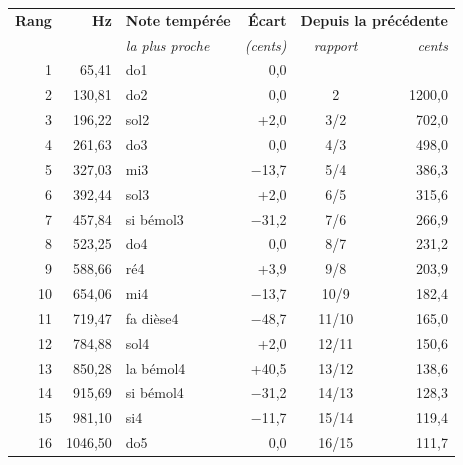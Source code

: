 
\begin{tabular}{@{}r r l r c r@{}}
\toprule
\textbf{Rang} & \textbf{Hz} & \textbf{Note tempérée} & \textbf{Écart} & \multicolumn{2}{c}{\textbf{Depuis la précédente}} \\
 & & \textit{la plus proche} & \textit{(cents)} & \textit{rapport} & \textit{cents} \\
\midrule
1 & 65{,}41 & do1 & 0{,}0 &  &  \\
2 & 130{,}81 & do2 & 0{,}0 & 2 & 1200{,}0 \\
3 & 196{,}22 & sol2 & +2{,}0 & 3/2 & 702{,}0 \\
4 & 261{,}63 & do3 & 0{,}0 & 4/3 & 498{,}0 \\
5 & 327{,}03 & mi3 & $-$13{,}7 & 5/4 & 386{,}3 \\
6 & 392{,}44 & sol3 & +2{,}0 & 6/5 & 315{,}6 \\
7 & 457{,}84 & si bémol3 & $-$31{,}2 & 7/6 & 266{,}9 \\
8 & 523{,}25 & do4 & 0{,}0 & 8/7 & 231{,}2 \\
9 & 588{,}66 & ré4 & +3{,}9 & 9/8 & 203{,}9 \\
10 & 654{,}06 & mi4 & $-$13{,}7 & 10/9 & 182{,}4 \\
11 & 719{,}47 & fa dièse4 & $-$48{,}7 & 11/10 & 165{,}0 \\
12 & 784{,}88 & sol4 & +2{,}0 & 12/11 & 150{,}6 \\
13 & 850{,}28 & la bémol4 & +40{,}5 & 13/12 & 138{,}6 \\
14 & 915{,}69 & si bémol4 & $-$31{,}2 & 14/13 & 128{,}3 \\
15 & 981{,}10 & si4 & $-$11{,}7 & 15/14 & 119{,}4 \\
16 & 1046{,}50 & do5 & 0{,}0 & 16/15 & 111{,}7 \\
\bottomrule
\end{tabular}
